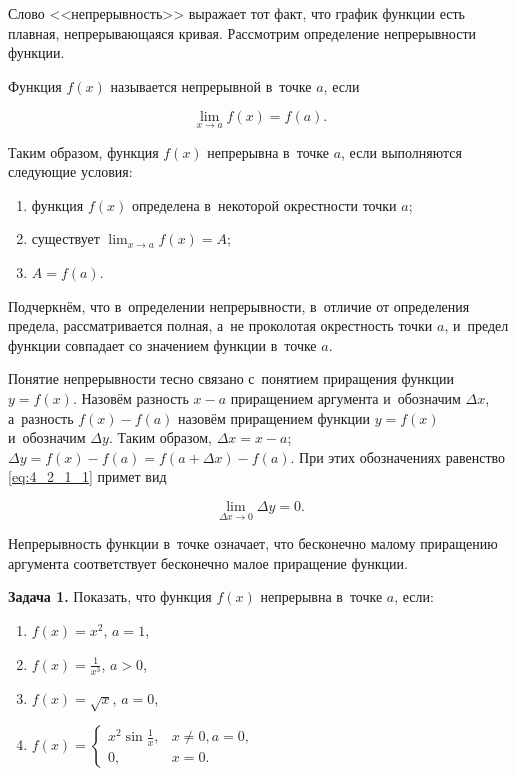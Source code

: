 
Слово <<непрерывность>> выражает тот факт, что график функции есть плавная,
непрерывающаяся кривая. Рассмотрим определение непрерывности функции.

\begin{Def}\label{df:4_2_1_1}
Функция $f(x)$ называется непрерывной в~точке $a$, если

\begin{equation}\label{eq:4_2_1_1}
\displaystyle \lim_{x \to a} f(x) = f(a).
\end{equation}
\end{Def}

\noindent
Таким образом, функция $f(x)$ непрерывна в~точке $a$, если выполняются
следующие условия:

\begin{enumerate}
\item функция $f(x)$ определена в~некоторой окрестности точки $a$;
\item существует $\displaystyle \lim_{x \to a} f(x) = A$;
\item $A = f(a)$.
\end{enumerate}

\noindent
Подчеркнём, что в~определении непрерывности, в~отличие от определения предела,
рассматривается полная, а~не проколотая окрестность точки $a$,
и~предел функции совпадает со значением функции в~точке $a$.

Понятие непрерывности тесно связано с~понятием приращения функции $y = f(x)$.
Назовём разность $x - a$ приращением аргумента и~обозначим $\Delta x$,
а~разность $f(x) - f(a)$ назовём приращением функции $y = f(x)$
и~обозначим $\Delta y$. Таким образом,
$\Delta x = x -a$; $\Delta y = f(x) - f(a) = f(a + \Delta x) - f(a)$.
При этих обозначениях равенство \eqref{eq:4_2_1_1} примет вид

\begin{equation*}
\displaystyle \lim_{\Delta x \to 0} \Delta y = 0.
\end{equation*}

Непрерывность функции в~точке означает, что бесконечно малому приращению
аргумента соответствует бесконечно малое приращение функции.

\textbf{Задача 1.}\label{ex:4_2_1_1} Показать, что функция $f(x)$ непрерывна
в~точке $a$, если:

\begin{enumerate} 
\item $f(x) = x^{2}$, \; $a = 1$, 
\item $\displaystyle f(x) = \frac{1}{x^{3}}$, \; $a > 0$,
\item $f(x) = \sqrt{x}$, \; $a = 0$,
\item $f(x) =
\begin{cases}
\displaystyle x^{2} \sin \frac{1}{x}, & x \ne 0, a = 0, \\
0, & x = 0.
\end{cases}
$
\end{enumerate}

